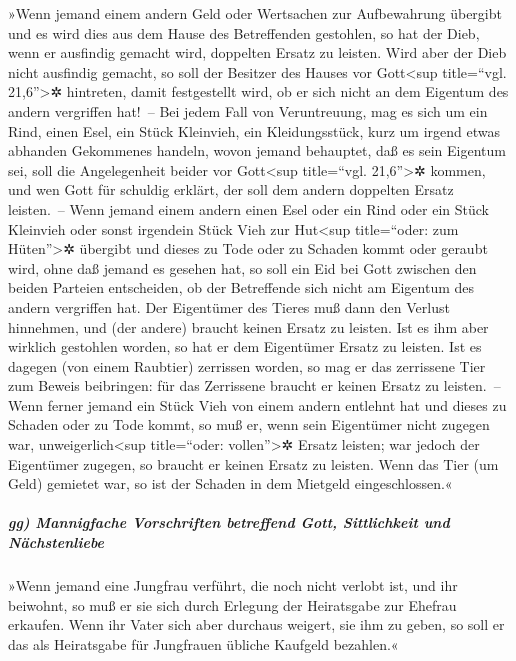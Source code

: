  »Wenn jemand einem andern Geld oder Wertsachen zur
Aufbewahrung übergibt und es wird dies aus dem Hause des Betreffenden
gestohlen, so hat der Dieb, wenn er ausfindig gemacht wird, doppelten
Ersatz zu leisten.  Wird aber der Dieb nicht ausfindig
gemacht, so soll der Besitzer des Hauses vor Gott\textless sup
title=``vgl. 21,6''\textgreater✲ hintreten, damit festgestellt wird, ob
er sich nicht an dem Eigentum des andern vergriffen hat!~--
 Bei jedem Fall von Veruntreuung, mag es sich um ein Rind,
einen Esel, ein Stück Kleinvieh, ein Kleidungsstück, kurz um irgend
etwas abhanden Gekommenes handeln, wovon jemand behauptet, daß es sein
Eigentum sei, soll die Angelegenheit beider vor Gott\textless sup
title=``vgl. 21,6''\textgreater✲ kommen, und wen Gott für schuldig
erklärt, der soll dem andern doppelten Ersatz leisten.~-- 
Wenn jemand einem andern einen Esel oder ein Rind oder ein Stück
Kleinvieh oder sonst irgendein Stück Vieh zur Hut\textless sup
title=``oder: zum Hüten''\textgreater✲ übergibt und dieses zu Tode oder
zu Schaden kommt oder geraubt wird, ohne daß jemand es gesehen hat,
 so soll ein Eid bei Gott zwischen den beiden Parteien
entscheiden, ob der Betreffende sich nicht am Eigentum des andern
vergriffen hat. Der Eigentümer des Tieres muß dann den Verlust
hinnehmen, und (der andere) braucht keinen Ersatz zu leisten.
 Ist es ihm aber wirklich gestohlen worden, so hat er dem
Eigentümer Ersatz zu leisten.  Ist es dagegen (von einem
Raubtier) zerrissen worden, so mag er das zerrissene Tier zum Beweis
beibringen: für das Zerrissene braucht er keinen Ersatz zu leisten.~--
 Wenn ferner jemand ein Stück Vieh von einem andern
entlehnt hat und dieses zu Schaden oder zu Tode kommt, so muß er, wenn
sein Eigentümer nicht zugegen war, unweigerlich\textless sup
title=``oder: vollen''\textgreater✲ Ersatz leisten;  war
jedoch der Eigentümer zugegen, so braucht er keinen Ersatz zu leisten.
Wenn das Tier (um Geld) gemietet war, so ist der Schaden in dem Mietgeld
eingeschlossen.«

\hypertarget{gg-mannigfache-vorschriften-betreffend-gott-sittlichkeit-und-nuxe4chstenliebe}{%
\subparagraph{gg) Mannigfache Vorschriften betreffend Gott, Sittlichkeit
und
Nächstenliebe}\label{gg-mannigfache-vorschriften-betreffend-gott-sittlichkeit-und-nuxe4chstenliebe}}

 »Wenn jemand eine Jungfrau verführt, die noch nicht
verlobt ist, und ihr beiwohnt, so muß er sie sich durch Erlegung der
Heiratsgabe zur Ehefrau erkaufen.  Wenn ihr Vater sich
aber durchaus weigert, sie ihm zu geben, so soll er das als Heiratsgabe
für Jungfrauen übliche Kaufgeld bezahlen.«

